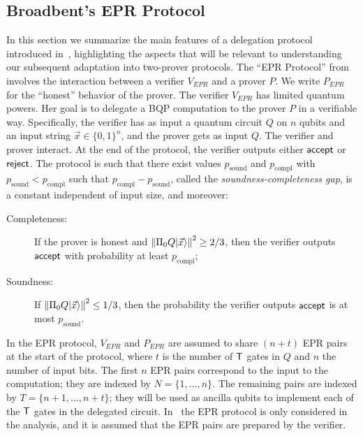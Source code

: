 \subsection{Broadbent's EPR Protocol}
\label{sec:EPR-protocol}


In this section we summarize the main features of a delegation protocol introduced in~\cite{broadbent15howtoverify}, highlighting the aspects that will be relevant to understanding our subsequent adaptation into two-prover protocols. The ``EPR Protocol'' from \cite{broadbent15howtoverify} involves the interaction between a verifier $V_{EPR}$ and a prover $P$. We write $P_{EPR}$ for the ``honest'' behavior of the prover. The verifier $V_{EPR}$ has limited quantum powers. Her goal is to delegate a BQP computation to the prover $P$ in a verifiable way. Specifically, the verifier has as input a quantum circuit $Q$ on $n$ qubits and an input string $\vec{x}\in\{0,1\}^n$, and the prover gets as input $Q$. The verifier and prover interact. At the end of the protocol, the verifier outputs either $\sf accept$ or $\sf reject$. The protocol is such that there exist values $p_{\mathrm{sound}}$ and $p_{\mathrm{compl}}$ with $p_{\mathrm{sound}}< p_{\mathrm{compl}}$ such that $p_{\mathrm{compl}}-p_{\mathrm{sound}}$, called the \emph{soundness-completeness gap}, is a constant independent of input size, and moreover:

\begin{description}
\item[Completeness:] If the prover is honest and $\left\|\Pi_0Q|\vec{x}\rangle\right\|^2 \geq 2/3$, then the verifier outputs $\sf accept$ with probability at least $p_{\mathrm{compl}}$;  
\item[Soundness:] If $\left\|\Pi_0Q|\vec{x}\rangle\right\|^2 \leq 1/3$, then the probability the verifier outputs $\sf accept$ is at most $p_{\mathrm{sound}}$.
\end{description}




In the EPR protocol, $V_{EPR}$ and $P_{EPR}$ are assumed to share $(n+t)$ EPR pairs at the start of the protocol, where $t$ is the number of $\sf T$ gates in $Q$ and $n$ the number of input bits. 
 The first $n$ EPR pairs correspond to the input to the computation; they are indexed by $N=\{1,\dots,n\}$. The remaining pairs are indexed by $T=\{n+1,\dots,n+t\}$; they will be used as ancilla qubits to  implement each of the $\sf T$ gates in the delegated circuit. 
 In~\cite{broadbent15howtoverify} the EPR protocol is only considered in the analysis, and it is assumed that the EPR pairs are prepared by the verifier.

